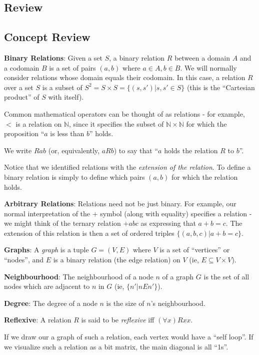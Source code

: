 \subsection{Review}
\begin{mdframed}[linewidth=1]
\section*{Concept Review}
\textbf{Binary Relations}:
Given a set $S$, a binary relation $R$ between a domain $A$ and a codomain $B$ is a set of pairs $(a, b)$ where $a \in A, b \in B$. We will normally consider relations whose domain equals their codomain. In this case, a relation $R$ over a set $S$ is a subset of $S^2 = S \times S = \{(s, s') | s, s' \in S\}$ (this is the ``Cartesian product'' of $S$ with itself). 

Common mathematical operators can be thought of as relations - for example, $<$ is a relation on $\mathbb{N}$, since it specifies the subset of $\mathbb{N} \times \mathbb{N}$ for which the proposition ``$a$ is less than $b$'' holds.

We write $Rab$ (or, equivalently, $aRb$) to say that ``$a$ holds the relation $R$ to $b$''.  

Notice that we identified relations with the \emph{extension of the relation}. To define a binary relation is simply to define which pairs $(a, b)$ for which the relation holds. 

\textbf{Arbitrary Relations}:
Relations need not be just binary. For example, our normal interpretation of the $+$ symbol (along with equality) specifies a relation - we might think of the ternary relation $+abc$ as expressing that $a + b = c$. The extension of this relation is then a set of ordered triples $\{(a, b, c) | a + b = c\}$. 

\textbf{Graphs}:
A \emph{graph} is a tuple $G = (V, E)$ where $V$ is a set of ``vertices'' or ``nodes'', and $E$ is a binary relation (the edge relation) on $V$ (ie, $E \subseteq V \times V$). 

\textbf{Neighbourhood}: The neighbourhood of a node $n$ of a graph $G$ is the set of all nodes which are adjacent to $n$ in $G$ (ie, $\{n' | nEn' \}$).

\textbf{Degree}: The degree of a node $n$ is the size of $n$'s neighbourhood. 


\textbf{Reflexive}: A relation $R$ is said to be \emph{reflexive} iff $(\forall x)Rxx$. 

If we draw our a graph of such a relation, each vertex would have a ``self loop''. If we visualize such a relation as a bit matrix, the main diagonal is all ``1s''. 


\end{mdframed}
